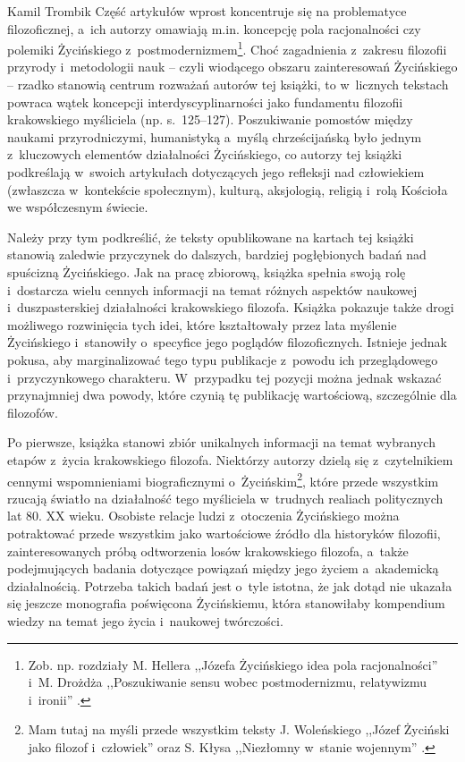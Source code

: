 \begin{recplenv}{Kamil Trombik}
Część artykułów wprost koncentruje się na problematyce filozoficznej, a~ich autorzy omawiają m.in. koncepcję pola racjonalności czy polemiki Życińskiego z~postmodernizmem\footnote{Zob. np. rozdziały M. Hellera ,,Józefa Życińskiego idea pola racjonalności''
\parencite[][]{heller_jozefa_2017} %
 i~M. Drożdża ,,Poszukiwanie sensu wobec postmodernizmu, relatywizmu i~ironii'' 
\parencite[][]{drozdz_poszukiwanie_2017}.%
}. Choć zagadnienia z~zakresu filozofii przyrody i~metodologii nauk -- czyli wiodącego obszaru zainteresowań Życińskiego -- rzadko stanowią centrum rozważań autorów tej książki, to w~licznych tekstach powraca wątek koncepcji interdyscyplinarności jako fundamentu filozofii krakowskiego myśliciela (np. s.~125–127). Poszukiwanie pomostów między naukami przyrodniczymi, humanistyką a~myślą chrześcijańską było jednym z~kluczowych elementów działalności Życińskiego, co autorzy tej książki podkreślają w~swoich artykułach dotyczących jego refleksji nad człowiekiem (zwłaszcza w~kontekście społecznym), kulturą, aksjologią, religią i~rolą Kościoła we współczesnym świecie.

Należy przy tym podkreślić, że teksty opublikowane na kartach tej książki stanowią zaledwie przyczynek do dalszych, bardziej pogłębionych badań nad spuścizną Życińskiego. Jak na pracę zbiorową, książka spełnia swoją rolę i~dostarcza wielu cennych informacji na temat różnych aspektów naukowej i~duszpasterskiej działalności krakowskiego filozofa. Książka pokazuje także drogi możliwego rozwinięcia tych idei, które kształtowały przez lata myślenie Życińskiego i~stanowiły o~specyfice jego poglądów filozoficznych. Istnieje jednak pokusa, aby marginalizować tego typu publikacje z~powodu ich przeglądowego i~przyczynkowego charakteru. W~przypadku tej pozycji można jednak wskazać przynajmniej dwa powody, które czynią tę publikację wartościową, szczególnie dla filozofów.

Po pierwsze, książka stanowi zbiór unikalnych informacji na temat wybranych etapów z~życia krakowskiego filozofa. Niektórzy autorzy dzielą się z~czytelnikiem cennymi wspomnieniami biograficznymi o~Życińskim\footnote{Mam tutaj na myśli przede wszystkim teksty J. Woleńskiego ,,Józef Życiński jako filozof i~człowiek'' oraz S. Kłysa ,,Niezłomny w~stanie wojennym''
\parencites[][]{wolenski_jozef_2017}[][]{klys_niezlomny_2017}.%
}, które przede wszystkim rzucają światło na działalność tego myśliciela w~trudnych realiach politycznych lat 80. XX wieku. Osobiste relacje ludzi z~otoczenia Życińskiego można potraktować przede wszystkim jako wartościowe źródło dla historyków filozofii, zainteresowanych próbą odtworzenia losów krakowskiego filozofa, a~także podejmujących badania dotyczące powiązań między jego życiem a~akademicką działalnością. Potrzeba takich badań jest o~tyle istotna, że jak dotąd nie ukazała się jeszcze monografia poświęcona Życińskiemu, która stanowiłaby kompendium wiedzy na temat jego życia i~naukowej twórczości.


\end{recplenv}
